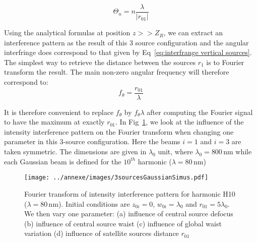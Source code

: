 \begin{equation}
\label{eq:interfrange vertical sources}
\Theta_n = n\frac{\lambda}{|r_{01}|}
\end{equation}


\noindent Using the analytical formulas at position $z>> Z_R$, we can extract an interference pattern as the result of this 3 source configuration and the angular interfringe does correspond to that given by Eq~\ref{eq:interfrange vertical sources}. The simplest way to retrieve the distance between the sources $r_1$ is to Fourier transform the result. The main non-zero angular frequency will therefore correspond to:
\begin{equation}
f_{\theta} = \frac{r_{01}}{\lambda}
\end{equation}

\noindent It is therefore convenient to replace $f_{\theta}$ by $f_{\theta}\lambda$ after computing the Fourier signal to have the maximum at exactly $r_{01}$. In Fig~\ref{fig:3sourcesGaussianSimus}, we look at the influence of the intensity interference pattern on the Fourier transform when changing one parameter in this 3-source configuration. Here the beams $i = 1$ and $i=3$ are taken symmetric.
The dimensions are given  in $\lambda_0$ unit, where $\lambda_0 = 800\,\mathrm{nm}$ while each Gaussian beam is defined for the $10^{th}$ harmonic ($\lambda = 80\,\mathrm{nm}$)

\begin{figure}[H]
\centering
\texttt{[image: ../annexe/images/3sourcesGaussianSimus.pdf]}\\
\caption{\label{fig:3sourcesGaussianSimus} Fourier transform of intensity interference pattern for harmonic H10 ($\lambda = 80\,\mathrm{nm}$). Initial conditions are $z_{0i} = 0$, $w_{0i}=\lambda_0$ and $r_{01} = 5\lambda_0$. We then vary one parameter: (a) influence of central source defocus (b) influence of central source waist (c) influence of global waist variation (d) influence of satellite sources distance $r_{01}$ }
\end{figure}

